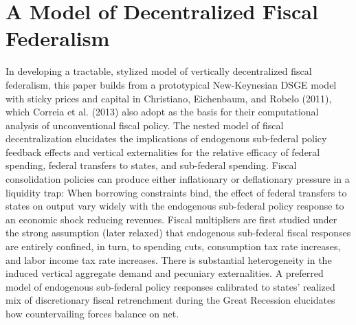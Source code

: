 \documentclass[12pt,letterpaper]{article}
\begin{document}
\section{A Model of Decentralized Fiscal Federalism}
In developing a tractable, stylized model of vertically decentralized fiscal federalism, this paper builds from a prototypical New-Keynesian DSGE model with sticky prices and capital in Christiano, Eichenbaum, and Robelo (2011), which Correia et al. (2013) also adopt as the basis for their computational analysis of unconventional fiscal policy. The nested model of fiscal decentralization elucidates the implications of endogenous sub-federal policy feedback effects and vertical externalities for the relative efficacy of federal spending, federal transfers to states, and sub-federal spending. Fiscal consolidation policies can produce either inflationary or deflationary pressure in a liquidity trap: When borrowing constraints bind, the effect of federal transfers to states on output vary widely with the endogenous sub-federal policy response to an economic shock reducing revenues. Fiscal multipliers are first studied under the strong assumption (later relaxed) that endogenous sub-federal fiscal responses are entirely confined, in turn, to spending cuts, consumption tax rate increases, and labor income tax rate increases. There is substantial heterogeneity in the induced vertical aggregate demand and pecuniary externalities. A preferred model of endogenous sub-federal policy responses calibrated to states' realized mix of discretionary fiscal retrenchment during the Great Recession elucidates how countervailing forces balance on net.
\end{document}
